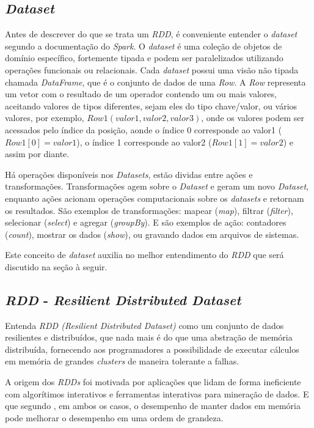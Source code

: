\subsection{\textit{Dataset}}

Antes de descrever do que se trata um \textit{RDD}, é conveniente entender o \textit{dataset} segundo a documentação do \textit{Spark}\cite{SparkPage}. O \textit{dataset} é uma coleção de objetos de domínio específico, fortemente tipada  e podem ser paralelizados utilizando operações funcionais ou relacionais. Cada \textit{dataset} possui uma visão não tipada chamada \textit{DataFrame}, que é o conjunto de dados de uma \textit{Row}. A \textit{Row} representa um vetor com o resultado de um operador contendo um ou mais valores, aceitando valores de tipos diferentes, sejam eles do tipo chave/valor, ou vários valores, por exemplo, $\textit{Row}1(valor1,valor2,valor3)$, onde os valores podem ser acessados pelo índice da posição, aonde o índice 0 corresponde ao valor1 (${Row}1[0]=valor1$), o índice 1 corresponde ao valor2  (${Row}1[1]=valor2$) e assim por diante.

Há operações disponíveis nos \textit{Datasets}, estão dividas entre ações e transformações. Transformações agem sobre o \textit{Dataset} e geram um novo \textit{Dataset}, enquanto ações acionam operações computacionais sobre os \textit{datasets} e retornam os resultados. São exemplos de transformações:  mapear (\textit{map}), filtrar (\textit{filter}), selecionar (\textit{select}) e agregar (\textit{groupBy}). E são exemplos de ação: contadores (\textit{count}), mostrar os dados (\textit{show}), ou gravando dados em arquivos de sistemas.

Este conceito de \textit{dataset} auxilia no melhor entendimento do \textit{RDD} que será discutido na seção à seguir.

\subsection{\textit{RDD} - \textit{Resilient Distributed Dataset}}

Entenda \textit{RDD (Resilient Distributed Dataset)} como um conjunto de dados resilientes e distribuídos, que nada mais é do que uma abstração de memória distribuída, fornecendo aos programadores a possibilidade de executar cálculos em memória de grandes \textit{clusters} de maneira tolerante a falhas.  

A origem dos \textit{RDDs} foi motivada por aplicações que lidam de forma ineficiente com algorítimos interativos e ferramentas interativas para mineração de dados. E que segundo \cite{Zaharia:2012:RDD} , em ambos os casos, o desempenho de manter dados em memória pode melhorar o desempenho em uma ordem de grandeza. 

